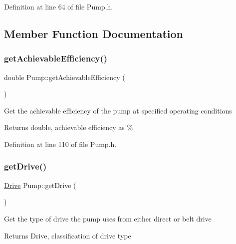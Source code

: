 Definition at line 64 of file Pump.\+h.



\subsection{Member Function Documentation}
\mbox{\label{class_pump_acf100af543142ab8404fc0ce2df1d157}} 
\subsubsection{\texorpdfstring{get\+Achievable\+Efficiency()}{getAchievableEfficiency()}}
{\footnotesize\ttfamily double Pump\+::get\+Achievable\+Efficiency (\begin{DoxyParamCaption}{ }\end{DoxyParamCaption})\hspace{0.3cm}{\ttfamily [inline]}}

Get the achievable efficiency of the pump at specified operating conditions

\begin{DoxyReturn}{Returns}
double, achievable efficiency as \% 
\end{DoxyReturn}


Definition at line 110 of file Pump.\+h.

\mbox{\label{class_pump_a7eae412e42d0a3351408391cd5fbef4e}} 
\subsubsection{\texorpdfstring{get\+Drive()}{getDrive()}}
{\footnotesize\ttfamily \hyperlink{class_pump_a32bf0ade131a11bb3b3fb374f638e983}{Drive} Pump\+::get\+Drive (\begin{DoxyParamCaption}{ }\end{DoxyParamCaption})\hspace{0.3cm}{\ttfamily [inline]}}

Get the type of drive the pump uses from either direct or belt drive

\begin{DoxyReturn}{Returns}
Drive, classification of drive type 
\end{DoxyReturn}


